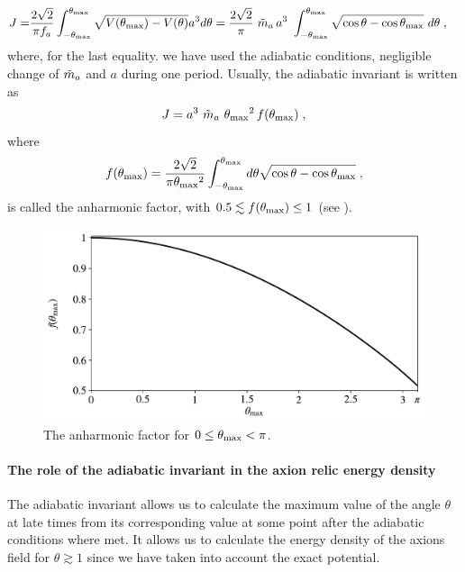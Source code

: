 \documentclass[11pt,a4paper]{article}
\begin{document}
\begin{eqnarray}
	J=&  \dfrac{2 \sqrt{2} }{\pi f_{a}{}}  \int_{- \theta_{\rm max}{}} ^{\theta_{\rm max}{}}  \sqrt{ V(\theta_{\rm max}) - V(\theta) } a^{3} d \theta = 
	\dfrac{2 \sqrt{2} }{\pi} \ \tilde m_{a}{} \, a^3 \ \displaystyle \int_{- \theta_{\rm max}{}}^{\theta_{\rm max}{}} \sqrt{\cos \theta - \cos \theta_{\rm max}{}} \ d \theta  
	\;,
	\label{eq:J_axion_derivation}
\end{eqnarray}
%
where, for the last equality. we have used the adiabatic conditions, \ie negligible change of $\tilde m_{a}{}$ and $a$ during one period. Usually, the adiabatic invariant is written as~\cite{Lyth:1991ub,Bae:2008ue} 
%
\begin{equation}
	J = a^3 \ \tilde m_{a}{} \ \theta_{\rm max}{}^2  \, f(\theta_{\rm max}{})  \;,
	\label{eq:J_axion_final_form}
\end{equation}
%
where 
\begin{equation}
	f(\theta_{\rm max}{}) =\dfrac{ 2 \sqrt{2}}{\pi \theta_{\rm max}{}^2 } \displaystyle \int_{- \theta_{\rm max}{}}^{\theta_{\rm max}{}} d \theta \sqrt{ \cos \theta - \cos \theta_{\rm max}{} } \;,
	\label{eq:anharmonic_f}
\end{equation}
%
is called the anharmonic factor, with $ 0.5 \lesssim f(\theta_{\rm max}{}) \leq 1$ (see ).


\begin{figure}[t]
	\includegraphics[width=1\textwidth]{figs/anharmonic_factor.pdf}
	\caption{The anharmonic factor for $0 \leq \theta_{\rm max}{} < \pi $.}
	\label{fig:anharmonic_factor}
\end{figure}



\paragraph{The role of the adiabatic invariant in the axion relic energy density}
%
The adiabatic invariant allows us to calculate the maximum value of the angle $\theta$ at late times from its corresponding value at some point after the adiabatic conditions where met. It allows us to calculate the energy density of the axions field for $\theta \gtrsim 1$ since we have taken into account the exact potential.
\end{document}
